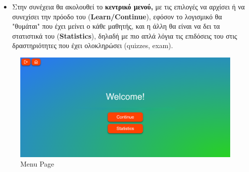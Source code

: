 \begin{itemize}
    \item Στην συνέχεια θα ακολουθεί το \textbf{κεντρικό μενού,} με τις επιλογές να αρχίσει ή να συνεχίσει την πρόοδο του (\textbf{\textlatin{Learn/Continue}}), εφόσον το λογισμικό θα "θυμάται" που έχει μείνει ο κάθε μαθητής, και η άλλη θα είναι να δει τα στατιστικά του (\textbf{\textlatin{Statistics}}), δηλαδή με πιο απλά λόγια τις επιδόσεις του στις δραστηριότητες που έχει ολοκληρώσει (\textlatin{quizzes, exam}).
\end{itemize}
\begin{figure}[H]
    \centering
    \includegraphics[width=1\linewidth]{img/Menu.png}
    \caption{\textlatin{Menu Page}}
\end{figure}


